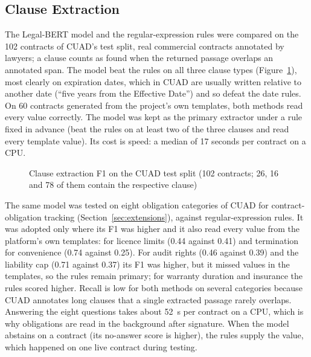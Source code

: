 \subsection{Clause Extraction}
The Legal-BERT model and the regular-expression rules were compared on the 102 contracts of CUAD's test split, real commercial contracts annotated by lawyers; a clause counts as found when the returned passage overlaps an annotated span. The model beat the rules on all three clause types (Figure~\ref{fig:clauses}), most clearly on expiration dates, which in CUAD are usually written relative to another date (``five years from the Effective Date'') and so defeat the date rules. On 60 contracts generated from the project's own templates, both methods read every value correctly. The model was kept as the primary extractor under a rule fixed in advance (beat the rules on at least two of the three clauses and read every template value). Its cost is speed: a median of 17 seconds per contract on a CPU.

\begin{figure}[H]
\centering
{}
\caption[Clause extraction F1 on the CUAD test split]{Clause extraction F1 on the CUAD test split (102 contracts; 26, 16 and 78 of them contain the respective clause)}\label{fig:clauses}
\end{figure}

The same model was tested on eight obligation categories of CUAD for contract-obligation tracking (Section~\ref{sec:extensions}), against regular-expression rules. It was adopted only where its F1 was higher and it also read every value from the platform's own templates: for licence limits (0.44 against 0.41) and termination for convenience (0.74 against 0.25). For audit rights (0.46 against 0.39) and the liability cap (0.71 against 0.37) its F1 was higher, but it missed values in the templates, so the rules remain primary; for warranty duration and insurance the rules scored higher. Recall is low for both methods on several categories because CUAD annotates long clauses that a single extracted passage rarely overlaps. Answering the eight questions takes about 52~s per contract on a CPU, which is why obligations are read in the background after signature. When the model abstains on a contract (its no-answer score is higher), the rules supply the value, which happened on one live contract during testing.

